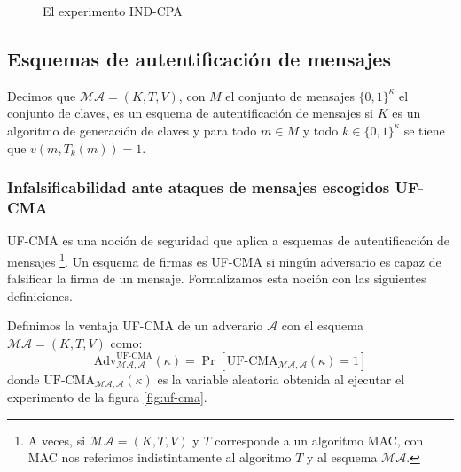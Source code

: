 \begin{figure}
\begin{centering}
\end{centering}
\caption{El experimento IND-CPA}
\label{fig:ind_cpa}
\end{figure}

\subsection{Esquemas de autentificación de mensajes}
\label{sect:uf-cma}
Decimos que $\mathcal{MA}=(K,T,V)$, con $M$ el conjunto de mensajes $\{0,1\}^\kappa$ el conjunto de claves,
es un esquema de autentificación de
mensajes si $K$ es un algoritmo de generación de claves y para todo $m \in M$ y todo
$k \in \{0,1\}^\kappa$ se tiene que $v(m, T_k(m)) = 1$.

\subsubsection{Infalsificabilidad ante ataques de mensajes escogidos UF-CMA}
UF-CMA es una noción de seguridad que aplica a esquemas de autentificación de mensajes
\footnote{A veces, si $\mathcal{MA} = (K, T, V)$ y $T$ corresponde a un algoritmo MAC,
con MAC nos referimos indistintamente al algoritmo $T$ y al esquema $\mathcal{MA}$.}.
Un esquema de firmas
es UF-CMA si ningún adversario es capaz de falsificar la firma de un mensaje. Formalizamos esta noción
con las siguientes definiciones.

\begin{definicion}
Definimos la ventaja \textrm{UF-CMA} de un adverario $\mathcal{A}$ con el esquema $\mathcal{MA} = (K, T, V)$
como:
$$\mathrm{Adv}^\text{UF-CMA}_{\mathcal{MA},\mathcal{A}}(\kappa) =
\Pr[\text{UF-CMA}_{\mathcal{MA},\mathcal{A}}(\kappa) = 1]$$
donde $\text{UF-CMA}_{\mathcal{MA},\mathcal{A}}(\kappa)$ es la variable aleatoria obtenida al
ejecutar el experimento de la figura \ref{fig:uf-cma}.
\end{definicion}

